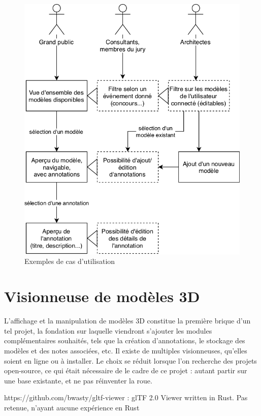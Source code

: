 \begin{figure}
    \centering
    \includegraphics[width=\linewidth]{Figures/use-cases.png}
    \caption{Exemples de cas d'utilisation}
    \label{fig:use-cases}
\end{figure}

\section{Visionneuse de modèles 3D}

L'affichage et la manipulation de modèles 3D constitue la première brique d'un tel projet, la fondation sur laquelle viendront s'ajouter les modules complémentaires souhaités, tels que la création d'annotations, le stockage des modèles et des notes associées, etc.
Il existe de multiples visionneuses, qu'elles soient en ligne ou à installer. Le choix se réduit lorsque l'on recherche des projets open-source, ce qui était nécessaire de le cadre de ce projet : autant partir sur une base existante, et ne pas réinventer la roue.

https://github.com/bwasty/gltf-viewer : glTF 2.0 Viewer written in Rust. Pas retenue, n'ayant aucune expérience en Rust

